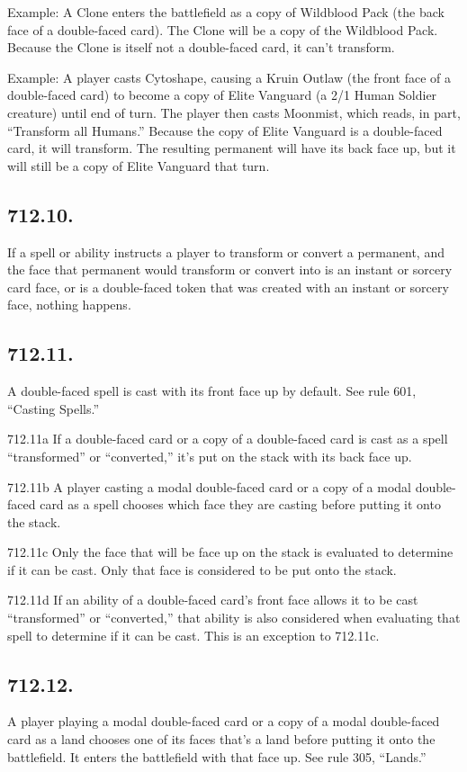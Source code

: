 Example: A Clone enters the battlefield as a copy of Wildblood Pack (the back face of a double-faced card). The Clone will be a copy of the Wildblood Pack. Because the Clone is itself not a double-faced card, it can’t transform.

Example: A player casts Cytoshape, causing a Kruin Outlaw (the front face of a double-faced card) to become a copy of Elite Vanguard (a 2/1 Human Soldier creature) until end of turn. The player then casts Moonmist, which reads, in part, “Transform all Humans.” Because the copy of Elite Vanguard is a double-faced card, it will transform. The resulting permanent will have its back face up, but it will still be a copy of Elite Vanguard that turn.

\subsection*{712.10.}
If a spell or ability instructs a player to transform or convert a permanent, and the face that permanent would transform or convert into is an instant or sorcery card face, or is a double-faced token that was created with an instant or sorcery face, nothing happens.

\subsection*{712.11.}
A double-faced spell is cast with its front face up by default. See rule 601, “Casting Spells.”

712.11a If a double-faced card or a copy of a double-faced card is cast as a spell “transformed” or “converted,” it’s put on the stack with its back face up.

712.11b A player casting a modal double-faced card or a copy of a modal double-faced card as a spell chooses which face they are casting before putting it onto the stack.

712.11c Only the face that will be face up on the stack is evaluated to determine if it can be cast. Only that face is considered to be put onto the stack.

712.11d If an ability of a double-faced card’s front face allows it to be cast “transformed” or “converted,” that ability is also considered when evaluating that spell to determine if it can be cast. This is an exception to 712.11c.

\subsection*{712.12.}
A player playing a modal double-faced card or a copy of a modal double-faced card as a land chooses one of its faces that’s a land before putting it onto the battlefield. It enters the battlefield with that face up. See rule 305, “Lands.”

